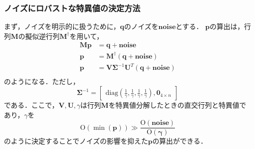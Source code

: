 \documentclass[a4paper]{jarticle}
\begin{document}
\subsubsection{ノイズにロバストな特異値の決定方法}
\label{subsubsec:noise_robust}
まず，ノイズを明示的に扱うために，$\mathbf{q}$のノイズを$\mathbf{noise}$とする．
$\mathbf{p}$の算出は，行列$\mathbf{M}$の擬似逆行列$\mathbf{M}^{\dagger}$を用いて，
\begin{equation}
    \begin{aligned}
    \mathbf{M}\mathbf{p} &= \mathbf{q} + \mathbf{noise}\\
              \mathbf{p} &= \mathbf{M}^{\dagger}(\mathbf{q} + \mathbf{noise})\\ 
            \mathbf{p} &= \mathbf{V}\mathbf{\Sigma}^{-1}\mathbf{U}^T(\mathbf{q}+\mathbf{noise})\\
    \end{aligned}
\end{equation}
のようになる．ただし，
\begin{equation}
            \mathbf{\Sigma}^{-1} =
            \begin{bmatrix}
                 \mathrm{diag}(\frac{1}{\gamma}, \frac{1}{\gamma}, \frac{1}{\gamma}, \frac{1}{\gamma}), \mathbf{0}_{4 \times n}
            \end{bmatrix}
\end{equation}
である．ここで，$\mathbf{V},\mathbf{U},\gamma$は行列$\mathbf{M}$を特異値分解したときの直交行列と特異値であり，$\gamma$を
\begin{equation}
    \mathrm{O}(\min({\mathbf{p}})) \gg \frac{\mathrm{O}(\mathbf{noise})}{\mathrm{O}(\mathbf{\gamma})}
    \label{eq:gamma}
\end{equation}
のように決定することでノイズの影響を抑えた$\mathbf{p}$の算出ができる．
\end{document}
